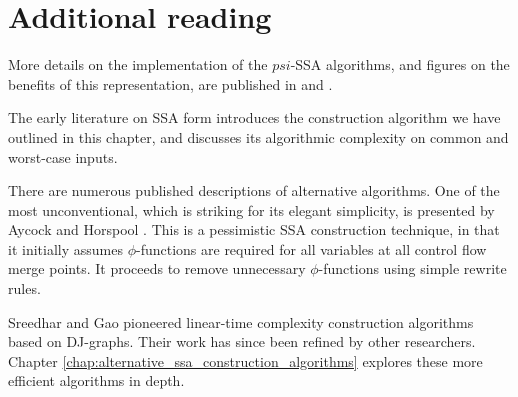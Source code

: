 

\section{Additional reading}

More details on the implementation of the $psi$-SSA algorithms, and
figures on the benefits of this representation, are published in
\cite{Stouchinin2001} and \cite{deferriere2006}.



The early literature on SSA form
\cite{cytron89efficiently,cytron91efficiently}
introduces the construction algorithm we have outlined in this chapter,
and discusses its algorithmic complexity on common and worst-case inputs.

There are numerous published descriptions of alternative algorithms.
One of the most unconventional, which is striking for its elegant simplicity,
is presented by Aycock
and Horspool \cite{aycock00simple}. 
This is a pessimistic SSA construction technique,
in that it initially assumes $\phi$-functions are required
for all variables at all control flow merge points. 
It proceeds to remove unnecessary $\phi$-functions 
using simple rewrite rules.

Sreedhar and Gao \cite{sreedhar95linear} pioneered
linear-time complexity construction algorithms based on DJ-graphs.
Their work has since been refined by other researchers.
Chapter \ref{chap:alternative_ssa_construction_algorithms}
explores these more efficient algorithms in depth.


